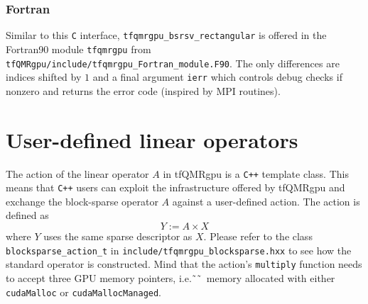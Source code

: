 \documentclass[oribibl]{llncs}
\newcommand{\ttt}[1]{\texttt{#1}}
\newcommand{\codename}{tfQMRgpu}
\begin{document}
\subsubsection{Fortran}
Similar to this \ttt{C} interface, \ttt{tfqmrgpu\_bsrsv\_rectangular} is offered in the Fortran90 module \ttt{tfqmrgpu} from \ttt{tfQMRgpu/include/tfqmrgpu\_Fortran\_module.F90}. The only differences are indices shifted by $1$ and a final argument \ttt{ierr} which controls debug checks if nonzero and returns the error code (inspired by MPI routines).

\section{User-defined linear operators}
%
The action of the linear operator $A$ in \codename{} is a \ttt{C++} template class.
This means that \ttt{C++} users can exploit the infrastructure offered by \codename{} and exchange
the block-sparse operator $A$ against a user-defined action. The action is defined as
\begin{equation}
	Y := A \times X
\end{equation}
where $Y$ uses the same sparse descriptor as $X$.
Please refer to the class \ttt{blocksparse\_action\_t} in \ttt{include/tfqmrgpu\_blocksparse.hxx}
to see how the standard operator is constructed.
Mind that the action's \ttt{multiply} function needs to accept three \ac{GPU} memory pointers, i.e.˜˜~memory allocated with either \ttt{cudaMalloc} or \ttt{cudaMallocManaged}.

 

\end{document}
